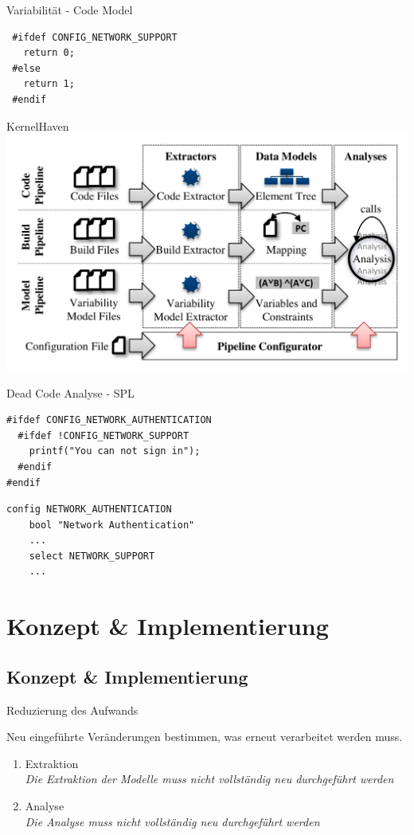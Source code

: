 \documentclass[compress, aspectratio=43, noserifmath]{beamer}
\begin{document}
\begin{frame}[containsverbatim]{Variabilit\"at - Code Model}
   
\begin{verbatim}
 #ifdef CONFIG_NETWORK_SUPPORT
   return 0;
 #else 
   return 1;
 #endif
\end{verbatim}
\end{frame}





\begin{frame}{KernelHaven}
\includegraphics[width=1\textwidth]{image/KernelHaven-Pipeline}
\end{frame}

\begin{frame}[containsverbatim]{Dead Code Analyse - SPL}

\begin{verbatim}
#ifdef CONFIG_NETWORK_AUTHENTICATION
  #ifdef !CONFIG_NETWORK_SUPPORT
    printf("You can not sign in");
  #endif
#endif
\end{verbatim}
\begin{verbatim}
config NETWORK_AUTHENTICATION
	bool "Network Authentication"
	...
	select NETWORK_SUPPORT
	...
\end{verbatim}
\end{frame}

\section{Konzept \& Implementierung}
\subsection{Konzept \& Implementierung}

\begin{frame}{Reduzierung des Aufwands}

Neu eingef\"uhrte Ver\"anderungen bestimmen, was erneut verarbeitet werden muss.
\begin{enumerate}
	\item Extraktion \\
	\emph{Die Extraktion der Modelle muss nicht vollst\"andig neu durchgef\"uhrt werden}
	\item Analyse \\
	\emph{Die Analyse muss nicht vollst\"andig neu durchgef\"uhrt werden}
\end{enumerate}
\end{frame}
\end{document}
